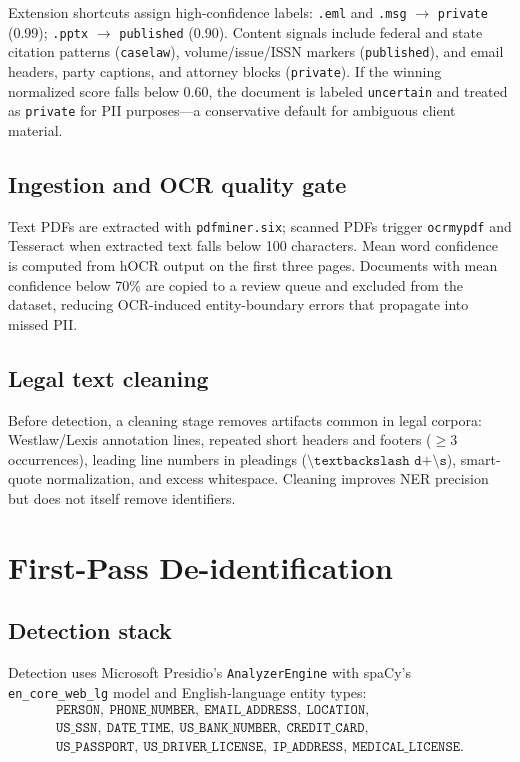 \documentclass[11pt,a4paper]{article}
\begin{document}
Extension shortcuts assign high-confidence labels: \texttt{.eml} and \texttt{.msg} $\rightarrow$ \texttt{private} (0.99); \texttt{.pptx} $\rightarrow$ \texttt{published} (0.90). Content signals include federal and state citation patterns (\texttt{caselaw}), volume/issue/ISSN markers (\texttt{published}), and email headers, party captions, and attorney blocks (\texttt{private}). If the winning normalized score falls below 0.60, the document is labeled \texttt{uncertain} and treated as \texttt{private} for PII purposes---a conservative default for ambiguous client material.

\subsection{Ingestion and OCR quality gate}

Text PDFs are extracted with \texttt{pdfminer.six}; scanned PDFs trigger \texttt{ocrmypdf} and Tesseract when extracted text falls below 100 characters. Mean word confidence is computed from hOCR output on the first three pages. Documents with mean confidence below 70\% are copied to a review queue and excluded from the dataset, reducing OCR-induced entity-boundary errors that propagate into missed PII.

\subsection{Legal text cleaning}

Before detection, a cleaning stage removes artifacts common in legal corpora: Westlaw/Lexis annotation lines, repeated short headers and footers ($\geq 3$ occurrences), leading line numbers in pleadings ($\texttt{\^{}\textbackslash d+\textbackslash s}$), smart-quote normalization, and excess whitespace. Cleaning improves NER precision but does not itself remove identifiers.

\section{First-Pass De-identification}

\subsection{Detection stack}

Detection uses Microsoft Presidio's \texttt{AnalyzerEngine} with spaCy's \texttt{en\_core\_web\_lg} model and English-language entity types:
\begin{multline*}
\texttt{PERSON},\ \texttt{PHONE\_NUMBER},\ \texttt{EMAIL\_ADDRESS},\ \texttt{LOCATION},\\
\texttt{US\_SSN},\ \texttt{DATE\_TIME},\ \texttt{US\_BANK\_NUMBER},\ \texttt{CREDIT\_CARD},\\
\texttt{US\_PASSPORT},\ \texttt{US\_DRIVER\_LICENSE},\ \texttt{IP\_ADDRESS},\ \texttt{MEDICAL\_LICENSE}.
\end{multline*}
\end{document}

